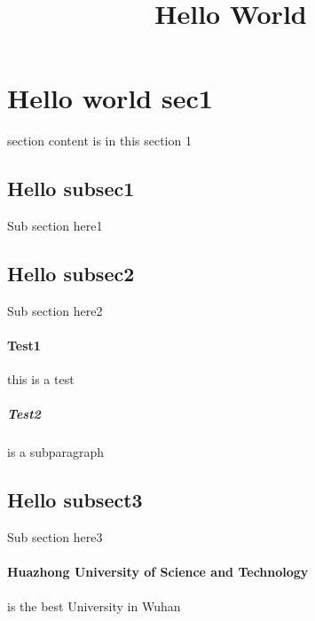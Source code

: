 \documentclass[10pt]{article}
\title{Hello World}
\begin{document}
\maketitle	%
\section{Hello world sec1} section content is in this section 1
\subsection{Hello subsec1} Sub section here1
\subsection{Hello subsec2} Sub section here2
\paragraph{Test1}this is a test
\subparagraph{Test2} is a subparagraph
\subsection{Hello subsect3} Sub section here3
\paragraph{Huazhong University of Science and Technology} is the best University in Wuhan
\end{document}
